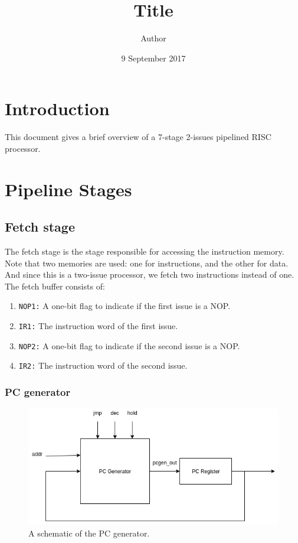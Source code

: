 \documentclass[12pt]{article}
\begin{document}
\title{Title}
\author{Author}
\date{9 September 2017}
\maketitle

\section{Introduction}
This document gives a brief overview of a 7-stage 2-issues pipelined RISC processor.

\section{Pipeline Stages}
\subsection{Fetch stage}
The fetch stage is the stage responsible for accessing the instruction memory.
Note that two memories are used: one for instructions, and the other for data.
And since this is a two-issue processor, we fetch two instructions instead of one. 
The fetch buffer consists of:
\begin{enumerate}
	\item \texttt{NOP1:} A one-bit flag to indicate if the first issue is a NOP.
	\item \texttt{IR1:} The instruction word of the first issue.
	\item \texttt{NOP2:} A one-bit flag to indicate if the second issue is a NOP.
	\item \texttt{IR2:} The instruction word of the second issue.
\end{enumerate}
\subsubsection{PC generator }

\begin{figure}
	\centering
	\includegraphics[width=0.7\linewidth]{figures/PCGen.png}
	\caption{A schematic of the PC generator.}
	\label{fig:pcgen}
\end{figure}
\end{document}
